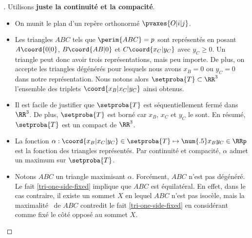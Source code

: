 

\begin{proof}[] \label{tri-topo-comp}
	Utilisons \textbf{juste la continuité et la compacité}.%
	\begin{itemize}
		\item On munit le plan d'un repère orthonormé $\pvaxes{O | i | j}$. 

		\item Les triangles $ABC$ tels que $\perim{ABC} = p$ sont représentés en posant $A\coord{0 | 0}$, $B\coord{AB | 0}$ et $C\coord{x_C | y_C}$ avec $y_C \geq 0$. Un triangle peut donc avoir trois représentations, mais peu importe.
		De plus, on accepte les triangles dégénérés pour lesquels nous avons $x_B = 0$ ou $y_C = 0$ dans notre représentation.
		Nous notons alors $\setproba{T} \subset \RR^3$ l'ensemble des triplets $\coord{x_B | x_C | y_C}$ ainsi obtenus.

		\item Il est facile de justifier que $\setproba{T}$ est séquentiellement fermé dans $\RR^3$.
		De plus, $\setproba{T}$ est borné car $x_B$, $x_C$ et $y_C$ le sont.
		En résumé, $\setproba{T}$ est un compact de $\RR^3$.

		\item La fonction $\alpha: \coord{x_B | x_C | y_C} \in \setproba{T} \mapsto \num{.5} x_B y_C \in \RRp$ est la fonction  des triangles représentés.
		Par continuité et compacité, $\alpha$ admet un maximum sur $\setproba{T}$. 
		

		\item Notons $ABC$ un triangle maximisant $\alpha$.
		Forcément, $ABC$ n'est pas dégénéré. 
		Le fait \ref{tri-one-side-fixed} implique que $ABC$ est équilatéral. 
		En effet,
		dans le cas contraire, il existe un sommet $X$ en lequel $ABC$ n'est pas isocèle, mais la \og maximalité \fg\ de $ABC$ contredit le fait \ref{tri-one-side-fixed} en considérant comme fixé le côté opposé au sommet $X$.
	\end{itemize}
	
	\null\vspace{-6ex}
\end{proof}




